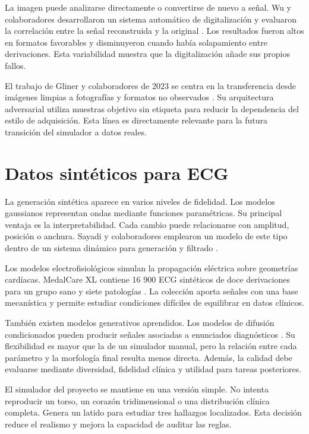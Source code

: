 La imagen puede analizarse directamente o convertirse de nuevo a señal. Wu y colaboradores desarrollaron un sistema automático de digitalización y evaluaron la correlación entre la señal reconstruida y la original \cite{wu2022digitization}. Los resultados fueron altos en formatos favorables y disminuyeron cuando había solapamiento entre derivaciones. Esta variabilidad muestra que la digitalización añade sus propios fallos.

El trabajo de Gliner y colaboradores de 2023 se centra en la transferencia desde imágenes limpias a fotografías y formatos no observados \cite{gliner2023}. Su arquitectura adversarial utiliza muestras objetivo sin etiqueta para reducir la dependencia del estilo de adquisición. Esta línea es directamente relevante para la futura transición del simulador a datos reales.

\section{Datos sintéticos para ECG}

La generación sintética aparece en varios niveles de fidelidad. Los modelos gaussianos representan ondas mediante funciones paramétricas. Su principal ventaja es la interpretabilidad. Cada cambio puede relacionarse con amplitud, posición o anchura. Sayadi y colaboradores emplearon un modelo de este tipo dentro de un sistema dinámico para generación y filtrado \cite{sayadi2010}.

Los modelos electrofisiológicos simulan la propagación eléctrica sobre geometrías cardíacas. MedalCare XL contiene 16 900 ECG sintéticos de doce derivaciones para un grupo sano y siete patologías \cite{gillette2023}. La colección aporta señales con una base mecanística y permite estudiar condiciones difíciles de equilibrar en datos clínicos.

También existen modelos generativos aprendidos. Los modelos de difusión condicionados pueden producir señales asociadas a enunciados diagnósticos \cite{alcaraz2023}. Su flexibilidad es mayor que la de un simulador manual, pero la relación entre cada parámetro y la morfología final resulta menos directa. Además, la calidad debe evaluarse mediante diversidad, fidelidad clínica y utilidad para tareas posteriores.

El simulador del proyecto se mantiene en una versión simple. No intenta reproducir un torso, un corazón tridimensional o una distribución clínica completa. Genera un latido para estudiar tres hallazgos localizados. Esta decisión reduce el realismo y mejora la capacidad de auditar las reglas.

